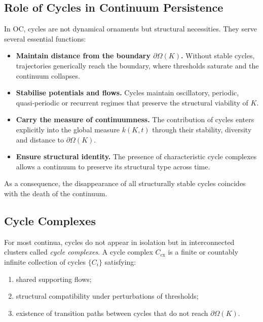 \subsection{Role of Cycles in Continuum Persistence}

In OC, cycles are not dynamical ornaments but structural necessities.
They serve several essential functions:

\begin{itemize}
  \item \textbf{Maintain distance from the boundary \(\partial\Omega(K)\).}  
        Without stable cycles, trajectories generically reach the boundary,
        where thresholds saturate and the continuum collapses.
  \item \textbf{Stabilise potentials and flows.}  
        Cycles maintain oscillatory, periodic, quasi-periodic or recurrent
        regimes that preserve the structural viability of \(K\).
  \item \textbf{Carry the measure of continuumness.}  
        The contribution of cycles enters explicitly into the global measure
        \(k(K,t)\) through their stability, diversity and distance to
        \(\partial\Omega(K)\).
  \item \textbf{Ensure structural identity.}  
        The presence of characteristic cycle complexes allows a continuum
        to preserve its structural type across time.
\end{itemize}

As a consequence, the disappearance of all structurally stable cycles
coincides with the death of the continuum.

\subsection{Cycle Complexes}

For most continua, cycles do not appear in isolation but in interconnected
clusters called \emph{cycle complexes}.
A cycle complex \(C_{\mathrm{cx}}\) is a finite or countably infinite
collection of cycles \(\{C_i\}\) satisfying:

\begin{enumerate}
  \item shared supporting flows;
  \item structural compatibility under perturbations of thresholds;
  \item existence of transition paths between cycles that do not reach
        \(\partial\Omega(K)\).
\end{enumerate}

